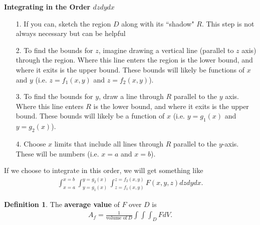 \documentclass[12pt, letter]{article}
\theoremstyle{plain}
\numberwithin{theorem}{section}
\theoremstyle{definition}
\newtheorem{definition}[theorem]{Definition}
\begin{document}
\textbf{Integrating in the Order $dzdydx$}
\begin{itemize}
\item[1.] If you can, sketch the region $D$ along with its ``shadow" $R$. This step is not always necessary but can be helpful
\item[2.] To find the bounds for $z$, imagine drawing a vertical line (parallel to $z$ axis) through the region. Where this line enters the region is the lower bound, and where it exits is the upper bound. These bounds will likely be functions of $x$ and $y$ (i.e. $z=f_1(x,y)$ and $z=f_2(x,y)$).
\item[3.] To find the bounds for $y$, draw a line through $R$ parallel to the $y$ axis. Where this line enters $R$ is the lower bound, and where it exits is the upper bound. These bounds will likely be a function of $x$ (i.e. $y=g_1(x)$ and $y=g_2(x)$).
\item[4.] Choose $x$ limits that include all lines through $R$ parallel to the $y$-axis. These will be numbers (i.e. $x=a$ and $x=b$).
\end{itemize}

\bigskip

If we choose to integrate in this order, we will get something like
\begin{align*}
\int_{x=a}^{x=b} \int_{y=g_1(x)}^{y=g_2(x)} \int_{z=f_1(x,y)}^{z=f_2(x,y)} F(x,y,z) dzdydx.
\end{align*}

\bigskip

\hrulefill

\bigskip

\begin{definition}
The \textbf{average value} of $F$ over $D$ is
\begin{align*}
A_f = \frac{1}{\text{volume of} \ D} \int \int \int_D F dV.
\end{align*}
\end{definition}

\bigskip

\hrulefill

\bigskip
\end{document}
